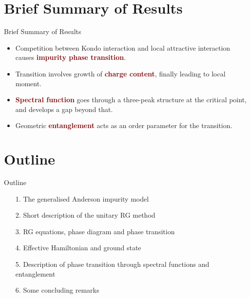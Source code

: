 \documentclass[aspectratio=169]{beamer}
\newcommand{\focus}[1]{\textcolor{maroon}{\textbf{#1}}}
\begin{document}
\section{Brief Summary of Results}
\begin{frame}[noframenumbering]{Brief Summary of Results}
\begin{itemize}[<+->]
	\item Competition between Kondo interaction and local attractive interaction causes \focus{impurity phase transition}.\\[20pt]
	\item Transition involves growth of \focus{charge content}, finally leading to local moment.\\[20pt]
	\item \focus{Spectral function} goes through a three-peak structure at the critical point, and develops a gap beyond that.\\[20pt]
	\item Geometric \focus{entanglement} acts as an order parameter for the transition.
\end{itemize}
\end{frame}

\section{Outline}
\begin{frame}[noframenumbering]{Outline}
\begin{itemize}[<alert@+>]
	\item[1.] {The generalised Anderson impurity model}\\[10pt]
	\item[2.] {Short description of the unitary RG method}\\[10pt]
	\item[3.] {RG equations, phase diagram and phase transition}\\[10pt]
	\item[4.] {Effective Hamiltonian and ground state}\\[10pt]
	\item[5.] {Description of phase transition through spectral functions and entanglement}\\[10pt]
	\item[6.] {Some concluding remarks}
\end{itemize}
\end{frame}
\end{document}
